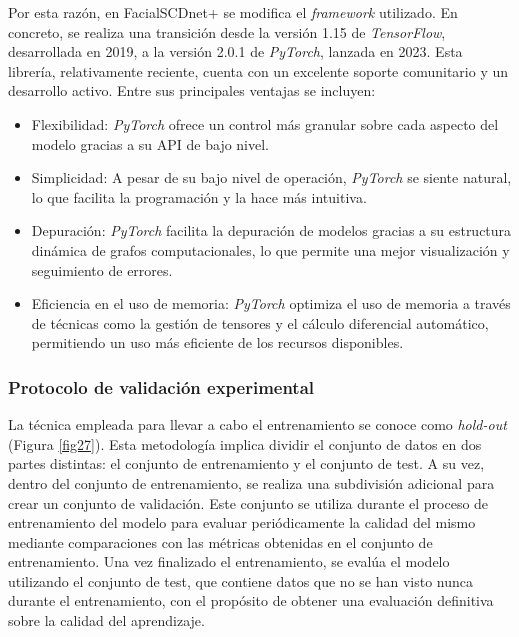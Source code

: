 Por esta razón, en FacialSCDnet+ se modifica el \textit{framework} utilizado. En concreto, se realiza una transición desde la versión 1.15 de \textit{TensorFlow}, desarrollada en 2019, a la versión 2.0.1 de \textit{PyTorch}, lanzada en 2023. Esta librería, relativamente reciente, cuenta con un excelente soporte comunitario y un desarrollo activo. Entre sus principales ventajas se incluyen:

\begin{itemize}
	\item Flexibilidad: \textit{PyTorch} ofrece un control más granular sobre cada aspecto del modelo gracias a su API de bajo nivel.
	\item Simplicidad: A pesar de su bajo nivel de operación, \textit{PyTorch} se siente natural, lo que facilita la programación y la hace más intuitiva.
	\item Depuración: \textit{PyTorch} facilita la depuración de modelos gracias a su estructura dinámica de grafos computacionales, lo que permite una mejor visualización y seguimiento de errores.
	\item Eficiencia en el uso de memoria: \textit{PyTorch} optimiza el uso de memoria a través de técnicas como la gestión de tensores y el cálculo diferencial automático, permitiendo un uso más eficiente de los recursos disponibles.
\end{itemize}


\subsubsection{Protocolo de validación experimental}\label{protocolo}

La técnica empleada para llevar a cabo el entrenamiento se conoce como \textit{hold-out} (Figura \ref{fig27}). Esta metodología implica dividir el conjunto de datos en dos partes distintas: el conjunto de entrenamiento y el conjunto de test. A su vez, dentro del conjunto de entrenamiento, se realiza una subdivisión adicional para crear un conjunto de validación. Este conjunto se utiliza durante el proceso de entrenamiento del modelo para evaluar periódicamente la calidad del mismo mediante comparaciones con las métricas obtenidas en el conjunto de entrenamiento. Una vez finalizado el entrenamiento, se evalúa el modelo utilizando el conjunto de test, que contiene datos que no se han visto nunca durante el entrenamiento, con el propósito de obtener una evaluación definitiva sobre la calidad del aprendizaje.

